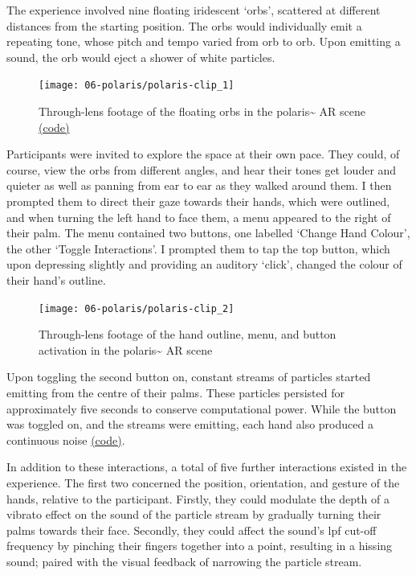 The experience involved nine floating iridescent `orbs', scattered at different distances from the starting position. The orbs would individually emit a repeating tone, whose pitch and tempo varied from orb to orb. Upon emitting a sound, the orb would eject a shower of white particles.

\begin{figure}[ht]
    \centering
    \texttt{[image: 06-polaris/polaris-clip\_1]}
    \captionsetup{justification=centering,margin=1.5cm}
    \caption{Through-lens footage of the floating orbs in the polaris\textasciitilde{} AR scene \citep[from][\href{https://youtu.be/lCBgMs8ULj0?t=19}{at 00:19}]{bilbow2022c} \href{https://github.com/sambilbow/polaris/tree/main/unity/Assets/StreamingAssets/PdAssets/polaris_study_sphere}{(code)}}\label{fig: polaris-clip_1}
\end{figure}

Participants were invited to explore the space at their own pace. They could, of course, view the orbs from different angles, and hear their tones get louder and quieter as well as panning from ear to ear as they walked around them. I then prompted them to direct their gaze towards their hands, which were outlined, and when turning the left hand to face them, a menu appeared to the right of their palm. The menu contained two buttons, one labelled `Change Hand Colour', the other `Toggle Interactions'. I prompted them to tap the top button, which upon depressing slightly and providing an auditory `click', changed the colour of their hand's outline.

\begin{figure}[ht]
    \centering
    \texttt{[image: 06-polaris/polaris-clip\_2]}
    \captionsetup{justification=centering,margin=1.5cm}
    \caption{Through-lens footage of the hand outline, menu, and button activation in the polaris\textasciitilde{} AR scene \citep[from][\href{https://youtu.be/lCBgMs8ULj0?t=140}{at 2:20}]{bilbow2022c}}\label{fig: polaris-clip_2}
\end{figure}

Upon toggling the second button on, constant streams of particles started emitting from the centre of their palms. These particles persisted for approximately five seconds to conserve computational power. While the button was toggled on, and the streams were emitting, each hand also produced a continuous noise \href{https://github.com/sambilbow/polaris/tree/main/unity/Assets/StreamingAssets/PdAssets}{(code)}.

In addition to these interactions, a total of five further interactions existed in the experience. The first two concerned the position, orientation, and gesture of the hands, relative to the participant. Firstly, they could modulate the depth of a vibrato effect on the sound of the particle stream by gradually turning their palms towards their face. Secondly, they could affect the sound's \gls{lpf} cut-off frequency by pinching their fingers together into a point, resulting in a hissing sound; paired with the visual feedback of narrowing the particle stream.

